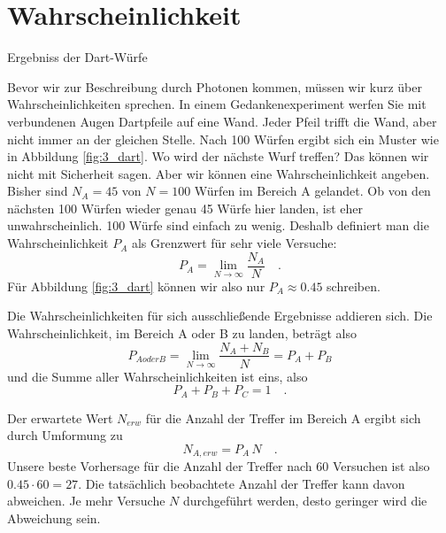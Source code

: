 \section{Wahrscheinlichkeit}

\begin{marginfigure}
    \caption{Ergebniss der Dart-Würfe}
    \label{fig:3_dart}
\end{marginfigure}


Bevor wir zur Beschreibung durch Photonen kommen, müssen wir kurz über Wahrscheinlichkeiten sprechen. In einem Gedankenexperiment werfen Sie mit verbundenen Augen Dartpfeile auf eine Wand. Jeder Pfeil trifft die Wand, aber nicht immer an der gleichen Stelle. Nach 100 Würfen ergibt sich ein Muster wie in Abbildung  \ref{fig:3_dart}. Wo wird der nächste Wurf treffen? Das können wir nicht mit Sicherheit sagen. Aber wir können eine Wahrscheinlichkeit angeben. Bisher sind $N_A =45$ von $N = 100$ Würfen im Bereich A gelandet. Ob von den nächsten 100 Würfen wieder genau 45 Würfe hier landen, ist eher unwahrscheinlich. 100 Würfe sind einfach zu wenig. Deshalb definiert man die Wahrscheinlichkeit $P_A$ als Grenzwert für sehr viele Versuche:
\begin{equation}
    P_A =  \lim_{N \rightarrow \infty} \frac{N_A}{N} \quad .
\end{equation}
Für Abbildung \ref{fig:3_dart} können wir also nur $P_A \approx 0.45$ schreiben. 


Die Wahrscheinlichkeiten für sich ausschließende Ergebnisse addieren sich. Die Wahrscheinlichkeit, im Bereich A oder B zu landen, beträgt also
\begin{equation}
    P_{A oder B} = \lim_{N \rightarrow \infty} \frac{N_A + N_B}{N} = P_A + P_B
\end{equation}
und die Summe aller Wahrscheinlichkeiten ist eins, also 
\begin{equation}
    P_A + P_B + P_C = 1 \quad .
\end{equation}

Der erwartete Wert $N_{erw}$ für die Anzahl der Treffer im Bereich A ergibt sich durch Umformung zu 
\begin{equation}
    N_{A, erw} = P_A \, N \quad .
\end{equation}
Unsere beste Vorhersage für die Anzahl der Treffer nach 60 Versuchen ist also $0.45 \cdot 60 = 27 $. Die tatsächlich beobachtete Anzahl der Treffer kann davon abweichen. Je mehr Versuche $N$ durchgeführt werden, desto geringer wird die Abweichung sein.



